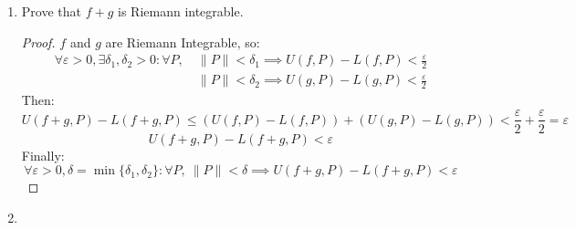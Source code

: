 \documentclass{article}
\newcommand{\vep}{\varepsilon}
\newcommand{\<}{\langle}
\renewcommand{\>}{\rangle}
\newcommand{\norm}[1]{\lVert #1 \rVert}
\begin{document}
\begin{enumerate}[(E1)]
\begin{enumerate}
    \begin{proof}
    First:
    \begin{align*}
    U(f+g,P) &= \sum_{k=1}^n \sup_{x \in P_k}(f + g)\Delta x_k\\
    &\leq \sum_{k=1}^n \left(\sup_{x \in P_k}(f)+\sup_{x \in P_k}(g)\right)\Delta x_k\\
    &= \sum_{k=1}^n \sup_{x \in P_k}(f)\Delta x_k+\sum_{k=1}^n\sup_{x \in P_k}(g)\Delta x_k\\
    \Rightarrow U(f+g,P) &\leq U(f,P) + U(g,P)
    \end{align*}
    Second:
    \begin{align*}
    L(f+g,P) &= \sum_{k=1}^n \inf_{x \in P_k}(f + g)\Delta x_k\\
    &\geq \sum_{k=1}^n \left(\inf_{x \in P_k}(f)+\inf_{x \in P_k}(g)\right)\Delta x_k\\
    &= \sum_{k=1}^n \inf_{x \in P_k}(f)\Delta x_k+\sum_{k=1}^n\inf_{x \in P_k}(g)\Delta x_k\\
    L(f+g,P) &\geq L(f,P) + L(g,P)\\
    \Rightarrow -L(f+g,P) &\leq - L(f,P) - L(g,P)
    \end{align*}
    The sum of these 2 inequalities is:
    \begin{align*}
    U(f+g,P) - L(f+g,P) &\leq U(f,P) + U(g,P) - L(f,P) - L(g,P)\\
    U(f+g,P) - L(f+g,P) &\leq \left(U(f,P) - L(f,P)\right) + \left(U(g,P) - L(g,P)\right)\\
	\end{align*}     
    \end{proof}
    \item 
    Prove that $f+g$ is Riemann integrable.
    \begin{proof}
	$f$ and $g$ are Riemann Integrable, so:
	\begin{align*}
	\forall \vep > 0, \exists \delta_1, \delta_2 > 0: \forall P,\ &\norm{P} < \delta_1 \implies U(f,P) - L(f,P) < \frac{\vep}{2} \\
	&\norm{P} < \delta_2 \implies U(g,P) - L(g,P) < \frac{\vep}{2}
	\end{align*}	 
	Then:
	$$U(f+g,P) - L(f+g,P) \leq \left(U(f,P) - L(f,P)\right) + \left(U(g,P) - L(g,P)\right)< \frac{\vep}{2}+\frac{\vep}{2} = \vep$$
	$$U(f+g,P) - L(f+g,P) < \vep$$
	Finally:
	$$\forall \vep > 0, \delta = \min\{\delta_1, \delta_2\}: \forall P,\ \norm{P} < \delta \implies U(f+g,P) - L(f+g,P) < \vep $$
    \end{proof}
    \item 

\end{enumerate}
\end{enumerate}
\end{document}
